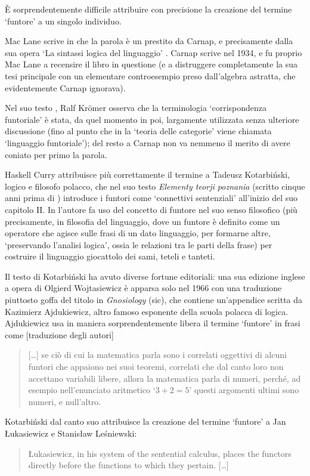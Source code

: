 \begin{terminology}
	\`E sorprendentemente difficile attribuire con precisione la creazione del termine `funtore' a un singolo individuo.

	Mac Lane scrive in \cite[note al cap. 1]{working-categories} che la parola è un prestito da Carnap, e precisamente dalla sua opera `La sintassi logica del linguaggio' \cite{carnappio}. Carnap scrive nel 1934, e fu proprio Mac Lane a recensire il libro in questione (e a distruggere completamente la sua tesi principale con un elementare controesempio preso dall'algebra astratta, che evidentemente Carnap ignorava).

	Nel suo testo \cite{kromer}, Ralf Kr\"omer osserva che la terminologia `corrispondenza funtoriale' è stata, da quel momento in poi, largamente utilizzata senza ulteriore discussione (fino al punto che in \cite{grothendieck1965introduction} la `teoria delle categorie' viene chiamata `linguaggio funtoriale'); del resto a Carnap non va nemmeno il merito di avere coniato per primo la parola.

	Haskell Curry \cite{Curry1961SomeLA} attribuisce più correttamente il termine a Tadeusz Kotarbiński, logico e filosofo polacco, che nel suo testo \emph{Elementy teorji poznania} (scritto cinque anni prima di \cite{carnappio}) introduce i funtori come `connettivi sentenziali' all'inizio del suo capitolo II. In \cite{Curry1961SomeLA} l'autore fa uso del concetto di funtore nel suo senso filosofico (più precisamente, in filosofia del linguaggio, dove un funtore è definito come un operatore che agisce sulle frasi di un dato linguaggio, per formarne altre, `preservando l'analisi logica', ossia le relazioni tra le parti della frase) per costruire il linguaggio giocattolo dei sami, teteli e tanteti.

	Il testo di Kotarbiński ha avuto diverse fortune editoriali: una sua edizione inglese a opera di Olgierd Wojtasiewicz è apparsa solo nel 1966 con una traduzione piuttosto goffa del titolo in \emph{Gnosiology} (sic), che contiene un'appendice scritta da Kazimierz Ajdukiewicz, altro famoso esponente della scuola polacca di logica. Ajdukiewicz usa in maniera sorprendentemente libera il termine `funtore' in frasi come [traduzione degli autori]
	\begin{quote}
		[\dots\unkern] se ciò di cui la matematica parla sono i correlati oggettivi di alcuni funtori che appaiono nei suoi teoremi, correlati che dal canto loro non accettano variabili libere, allora la matematica parla di numeri, perché, ad esempio nell'enunciato aritmetico `\(3 + 2 = 5\)' questi argomenti ultimi sono numeri, e null'altro.
	\end{quote}
	Kotarbiński dal canto suo attribuisce la creazione del termine `funtore' a Jan Łukasiewicz e Stanisław Leśniewski:
	\begin{quotation}
		{\L}ukasiewicz, in his system of the sentential calculus, places the functors directly before the functions to which they pertain. [\dots\unkern]


\end{quotation}
\end{terminology}
